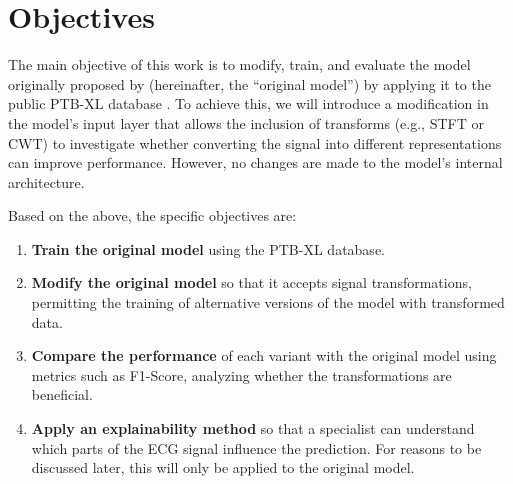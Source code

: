 \section{Objectives}
The main objective of this work is to modify, train, and evaluate the model originally proposed by \cite{ribeiro} (hereinafter, the “original model”) by applying it to the public PTB-XL database \citep{ptbxldb}. To achieve this, we will introduce a modification in the model’s input layer that allows the inclusion of transforms (e.g., STFT or CWT) to investigate whether converting the signal into different representations can improve performance. However, no changes are made to the model’s internal architecture.

Based on the above, the specific objectives are:

\begin{enumerate}
	\item \textbf{Train the original model} using the PTB-XL database.
	\item \textbf{Modify the original model} so that it accepts signal transformations, permitting the training of alternative versions of the model with transformed data.
	\item \textbf{Compare the performance} of each variant with the original model using metrics such as F1-Score, analyzing whether the transformations are beneficial.
	\item \textbf{Apply an explainability method} so that a specialist can understand which parts of the ECG signal influence the prediction. For reasons to be discussed later, this will only be applied to the original model.
\end{enumerate}

